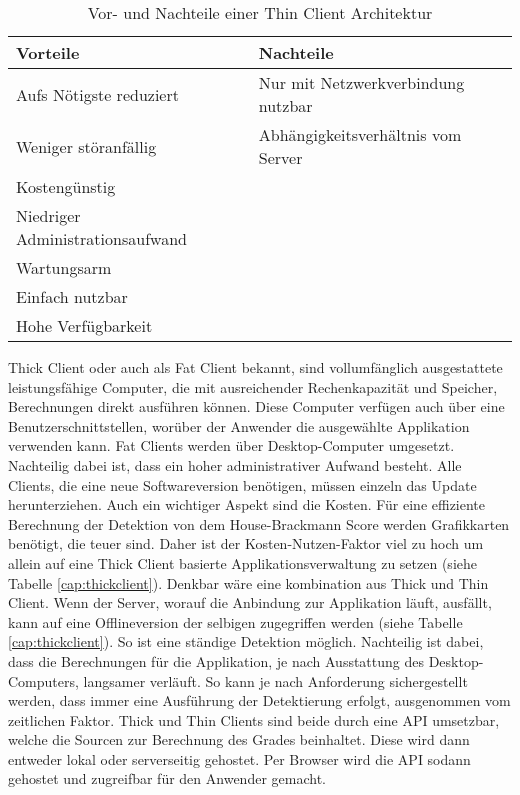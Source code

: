 \begin{table}[b]\vspace{1ex}\centering
  \begin{tabular*}{14cm}{l|l}
  \textbf{Vorteile} & \textbf{Nachteile}
  \\\hline\hline
  Aufs Nötigste reduziert          & Nur mit Netzwerkverbindung nutzbar   \\
  Weniger störanfällig             & Abhängigkeitsverhältnis vom Server   \\
  Kostengünstig                    &                                      \\
  Niedriger Administrationsaufwand &                                      \\
  Wartungsarm                      &                                      \\
  Einfach nutzbar                  &                                      \\
  Hohe Verfügbarkeit               &
  \\\hline
  \end{tabular*}
  \caption[Vor- und Nachteile von Thin Client]{Vor- und Nachteile einer Thin Client Architektur}\label{cap:thinclient}
\vspace{1ex}\end{table}\label{table:thinclient}

Thick Client oder auch als Fat Client bekannt, sind vollumfänglich ausgestattete leistungsfähige Computer, die mit ausreichender Rechenkapazität und Speicher, Berechnungen direkt ausführen können. Diese Computer verfügen auch über eine Benutzerschnittstellen, worüber der Anwender die ausgewählte Applikation verwenden kann. Fat Clients werden über Desktop-Computer umgesetzt. Nachteilig dabei ist, dass ein hoher administrativer Aufwand besteht. Alle Clients, die eine neue Softwareversion benötigen, müssen einzeln das Update herunterziehen. Auch ein wichtiger Aspekt sind die Kosten. Für eine effiziente Berechnung der Detektion von dem House-Brackmann Score werden Grafikkarten benötigt, die teuer sind. Daher ist der Kosten-Nutzen-Faktor viel zu hoch um allein auf eine Thick Client basierte Applikationsverwaltung zu setzen (siehe Tabelle \ref{cap:thickclient}).
Denkbar wäre eine kombination aus Thick und Thin Client. Wenn der Server, worauf die Anbindung zur Applikation läuft, ausfällt, kann auf eine Offlineversion der selbigen zugegriffen werden (siehe Tabelle \ref{cap:thickclient}). So ist eine ständige Detektion möglich. Nachteilig ist dabei, dass die Berechnungen für die Applikation, je nach Ausstattung des Desktop-Computers, langsamer verläuft. So kann je nach Anforderung sichergestellt werden, dass immer eine Ausführung der Detektierung erfolgt, ausgenommen vom zeitlichen Faktor. Thick und Thin Clients sind beide durch eine API umsetzbar, welche die Sourcen zur Berechnung des Grades beinhaltet. Diese wird dann entweder lokal oder serverseitig gehostet. Per Browser wird die API sodann gehostet und zugreifbar für den Anwender gemacht.

